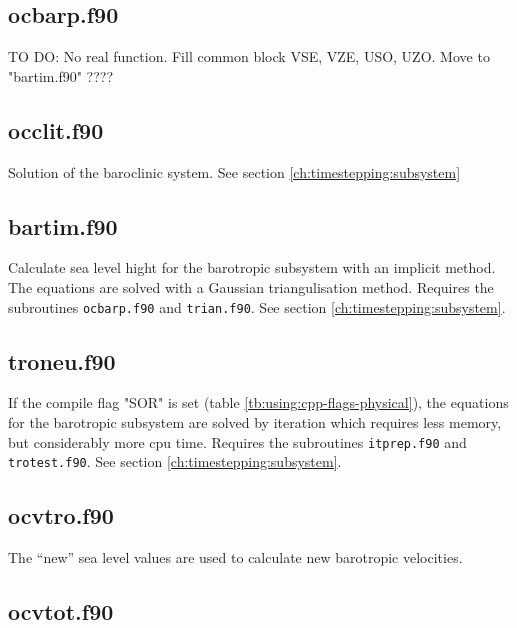 \subsection{ocbarp.f90}
\label{ch:timestepping:ocbarp}

TO DO: No real function. Fill common block VSE, VZE, USO, UZO. Move to "bartim.f90" ????

\subsection{occlit.f90}
\label{ch:timestepping:occlit}

Solution of the baroclinic system. See section \ref{ch:timestepping:subsystem}

\subsection{bartim.f90}
\label{ch:timestepping:bartim}

Calculate sea level hight for the barotropic subsystem with an implicit method.
The equations are solved with a Gaussian triangulisation method.
Requires the subroutines \texttt{ocbarp.f90} and \texttt{trian.f90}.
See section \ref{ch:timestepping:subsystem}.

\subsection{troneu.f90}
\label{ch:timestepping:troneu}

If the compile flag  "SOR" is set (table \ref{tb:using:cpp-flags-physical}), the equations for the barotropic subsystem are solved by iteration
which requires less memory, but considerably more cpu time.
Requires the subroutines \texttt{itprep.f90} and \texttt{trotest.f90}.
See section \ref{ch:timestepping:subsystem}.

\subsection{ocvtro.f90}
\label{ch:timestepping:ocvtro}

The ``new'' sea level values are used to calculate new barotropic velocities.

\subsection{ocvtot.f90}
\label{ch:timestepping:ocvtot}


